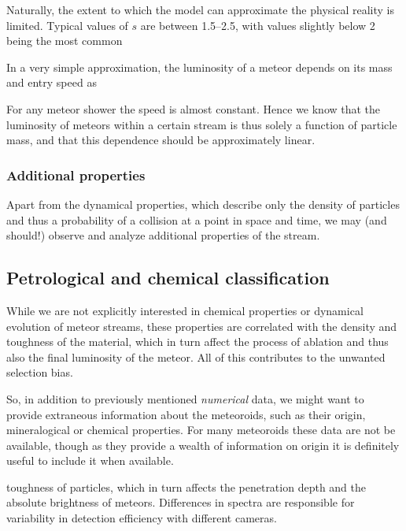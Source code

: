             Naturally, the extent to which the model can approximate the physical reality is limited.
            Typical values of $s$ are between \numrange{1.5}{2.5}, with values slightly below 2 being the most common \cite{...}

            In a very simple approximation, the luminosity of a meteor depends on its mass and entry speed as

            For any meteor shower the speed is almost constant. Hence we know that the luminosity of meteors
            within a certain stream is thus solely a function of particle mass, and that this dependence should
            be approximately linear.

        \subsubsection{Additional properties} \label{mpa}
            Apart from the dynamical properties, which describe only the density of particles
            and thus a probability of a collision at a point in space and time,
            we may (and should!) observe and analyze additional properties of the stream.

            \subsection{Petrological and chemical classification} \label{mpac}
                While we are not explicitly interested in chemical properties
                or dynamical evolution of meteor streams, these properties
                are correlated with the density and toughness of the material,
                which in turn affect the process of ablation
                and thus also the final luminosity of the meteor.
                All of this contributes to the unwanted selection bias.

                So, in addition to previously mentioned \textit{numerical} data, we might want to
                provide extraneous information about the meteoroids, such as their origin,
                mineralogical or chemical properties.
                For many meteoroids these data are not be available,
                though as they provide a wealth of information on origin
                it is definitely useful to include it when available.


                toughness of particles, which in turn affects the penetration depth
                and the absolute brightness of meteors.
                Differences in spectra are responsible for variability in detection efficiency with different cameras.


